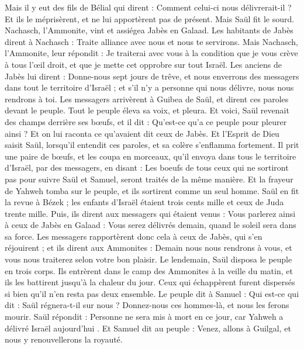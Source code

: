 \begin{multicols}{2}
Mais il y eut des fils de Bélial qui dirent : Comment celui-ci nous délivrerait-il ? Et ils le méprisèrent, et ne lui apportèrent pas de présent. Mais Saül fit le sourd.
\VerseOne{}Nachasch, l’Ammonite, vint et assiégea Jabès en Galaad. Les habitants de Jabès dirent à Nachasch : Traite alliance avec nous et nous te servirons.
Mais Nachasch, l’Ammonite, leur répondit : Je traiterai avec vous à la condition que je vous crève à tous l’œil droit, et que je mette cet opprobre sur tout Israël.
Les anciens de Jabès lui dirent : Donne-nous sept jours de trêve, et nous enverrons des messagers dans tout le territoire d'Israël ; et s'il n'y a personne qui nous délivre, nous nous rendrons à toi.
Les messagers arrivèrent à Guibea de Saül, et dirent ces paroles devant le peuple. Tout le peuple éleva sa voix, et pleura.
Et voici, Saül revenait des champs derrière ses bœufs, et il dit : Qu'est-ce qu'a ce peuple pour pleurer ainsi ? Et on lui raconta ce qu'avaient dit ceux de Jabès.
Et l'Esprit de Dieu saisit Saül, lorsqu'il entendit ces paroles, et sa colère s’enflamma fortement.
Il prit une paire de bœufs, et les coupa en morceaux, qu’il envoya dans tous le territoire d'Israël, par des messagers, en disant : Les boeufs de tous ceux qui ne sortiront pas pour suivre Saül et Samuel, seront traités de la même manière. Et la frayeur de Yahweh tomba sur le peuple, et ils sortirent comme un seul homme.
Saül en fit la revue à Bézek ; les enfants d'Israël étaient trois cents mille et ceux de Juda trente mille.
Puis, ils dirent aux messagers qui étaient venus : Vous parlerez ainsi à ceux de Jabès en Galaad : Vous serez délivrés demain, quand le soleil sera dans sa force. Les messagers rapportèrent donc cela à ceux de Jabès, qui s'en réjouirent ;
et ils dirent aux Ammonites : Demain nous nous rendrons à vous, et vous nous traiterez selon votre bon plaisir.
Le lendemain, Saül disposa le peuple en trois corps. Ils entrèrent dans le camp des Ammonites à la veille du matin, et ils les battirent jusqu’à la chaleur du jour. Ceux qui échappèrent furent dispersés si bien qu'il n'en resta pas deux ensemble.
Le peuple dit à Samuel : Qui est-ce qui dit : Saül régnera-t-il sur nous ? Donnez-nous ces hommes-là, et nous les ferons mourir.
Saül répondit : Personne ne sera mis à mort en ce jour, car Yahweh a délivré Israël aujourd'hui .
Et Samuel dit au peuple : Venez, allons à Guilgal, et nous y renouvellerons la royauté.

\end{multicols}
